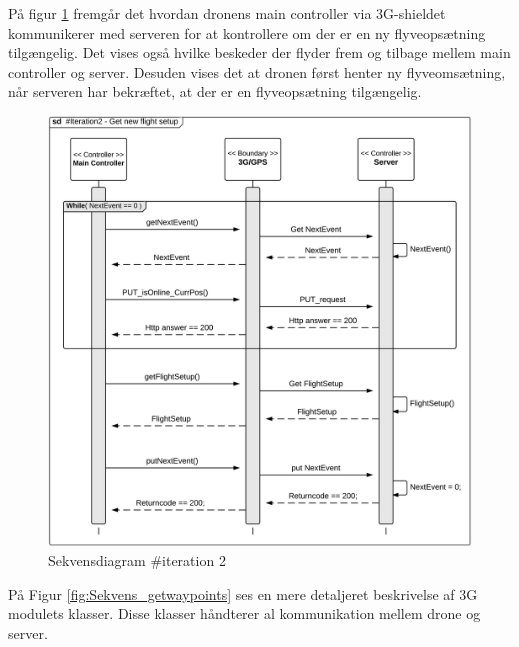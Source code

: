 \newpage

På figur \ref{fig:Sekvens_diagram_iteration2_2} fremgår det hvordan dronens main controller via 3G-shieldet kommunikerer med serveren for at kontrollere om der er en ny flyveopsætning tilgængelig. Det vises også hvilke beskeder der flyder frem og tilbage mellem main controller og server. Desuden vises det at dronen først henter ny flyveomsætning, når serveren har bekræftet, at der er en flyveopsætning tilgængelig.   

\begin{figure}[H]
	\centering
	\includegraphics[width=1\textwidth]{Billeder/sekvens/sekvens_iteration2_2}
	\caption{Sekvensdiagram \#iteration 2}
	\label{fig:Sekvens_diagram_iteration2_2}
\end{figure}

På Figur \ref{fig:Sekvens_getwaypoints} ses en mere detaljeret beskrivelse af 3G modulets klasser. Disse klasser håndterer al kommunikation mellem drone og server.

